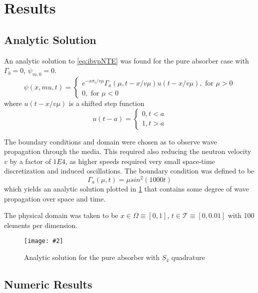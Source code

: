 \documentclass{article}
\newcommand{\myfig}[2]{\texttt{[image: \#2]}}
\begin{document}
\section{Results} \label{sec:results}

\subsection{Analytic Solution} \label{sec:analyticSoln}
An analytic solution to \cref{eq:ibvpNTE} was found for the pure absorber case
with $\Gamma_b=0$, $\psi_{m,0}=0$.
\begin{equation}
    \label{eq:analyticSoln}
    \psi(x,mu,t) = \begin{cases}
        e^{-x\sigma_t/v\mu}\Gamma_a(\mu, t-x/v\mu)u(t-x/v\mu), \text{ for }\mu>0\\
        0, \text{ for }\mu<0
    \end{cases}
\end{equation}
where $u(t-x/v\mu)$ is a shifted step function
\begin{equation}
    u(t-a) = \begin{cases}
        0,t<a \\
        1,t>a
    \end{cases}
\end{equation}

The boundary conditions and domain were chosen as to observe wave propagation through
the media.
This required also reducing the neutron velocity $v$ by a factor of $1E4$, as higher speeds
required very small space-time discretization and induced oscillations.
The boundary condition was defined to be
\begin{equation}
    \label{eq:analyticBound}
    \Gamma_a(\mu, t) = \mu sin^2(1000t)
\end{equation}
which yields an analytic solution plotted in \cref{fig:analyticSoln} that contains
some degree of wave propagation over space and time.

The physical domain was taken to be $x\in\Omega\equiv[0, 1]$, $t\in\mathcal{T}\equiv[0,0.01]$ with
100 elements per dimension.

\begin{figure}[h!]
    \centering
    \myfig{3.5in}{../figures/analyticSolution-s3.png}
    \caption{Analytic solution for the pure absorber with $S_4$ quadrature}
    \label{fig:analyticSoln}
\end{figure}

\subsection{Numeric Results} \label{sec:femResults}
\end{document}

